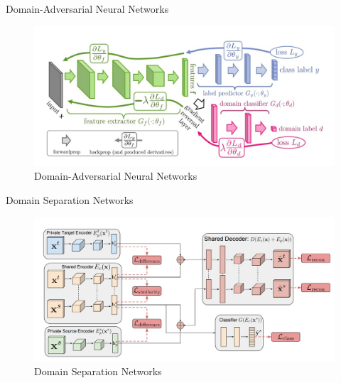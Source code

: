 \begin{frame}{Domain-Adversarial Neural Networks}
    \begin{figure}
        \centering
        \includegraphics[width=\textwidth]{pic/pic0203.jpg}
        \caption{Domain-Adversarial Neural Networks}
        \label{fig:08}
    \end{figure}
\end{frame}

\begin{frame}{Domain Separation Networks}
    \begin{figure}
        \centering
        \includegraphics[width=\textwidth]{pic/pic0204.jpg}
        \caption{Domain Separation Networks}
        \label{fig:09}
    \end{figure}
\end{frame}